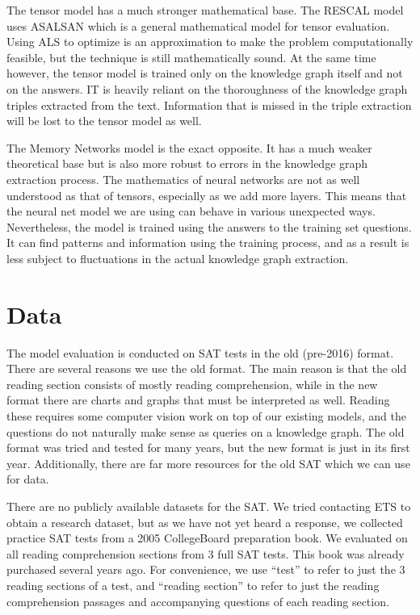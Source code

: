 \documentclass[pageno]{final_paper}
\begin{document}
The tensor model has a much stronger mathematical base. The RESCAL model uses
ASALSAN \cite{Bader2007} which is a general mathematical model for tensor
evaluation. Using ALS to optimize is an approximation to make the problem
computationally feasible, but the technique is still mathematically sound. At
the same time however, the tensor model is trained only on the knowledge graph
itself and not on the answers. IT is heavily reliant on the thoroughness of the
knowledge graph triples extracted from the text. Information that is missed in
the triple extraction will be lost to the tensor model as well.

The Memory Networks model is the exact opposite. It has a much weaker
theoretical base but is also more robust to errors in the knowledge graph
extraction process. The mathematics of neural networks are not as well
understood as that of tensors, especially as we add more layers. This means that
the neural net model we are using can behave in various unexpected ways.
Nevertheless, the model is trained using the answers to the training set
questions. It can find patterns and information using the training process, and
as a result is less subject to fluctuations in the actual knowledge graph
extraction.

\section{Data}
\label{Data}

The model evaluation is conducted on SAT tests in the old (pre-2016) format.
There are several reasons we use the old format. The main reason is that the old
reading section consists of mostly reading comprehension, while in the new
format there are charts and graphs that must be interpreted as well. Reading
these requires some computer vision work on top of our existing models, and the
questions do not naturally make sense as queries on a knowledge graph. The old
format was tried and tested for many years, but the new format is just in its
first year. Additionally, there are far more resources for the old SAT which we
can use for data.

There are no publicly available datasets for the SAT. We tried contacting ETS to
obtain a research dataset, but as we have not yet heard a response, we collected
practice SAT tests from a 2005 CollegeBoard preparation book. We evaluated on
all reading comprehension sections from 3 full SAT tests. This book was already
purchased several years ago. For convenience, we use ``test'' to refer to just
the 3 reading sections of a test, and ``reading section'' to refer to just the
reading comprehension passages and accompanying questions of each reading
section.
\end{document}
